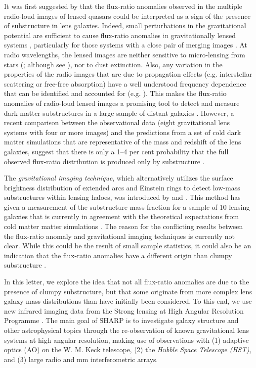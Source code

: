 \documentclass[a4paper,fleqn,usenatbib,useAMS]{mnras}
\begin{document}
It was first suggested by \citet{Mao1998} that the flux-ratio anomalies observed in the multiple radio-loud images of lensed quasars could be interpreted as a sign of the presence of substructure in lens galaxies. Indeed, small perturbations in the gravitational potential are sufficient to cause flux-ratio anomalies in gravitationally lensed systems \citep{metcalf01,Dalal2002,Bradac02}, particularly for those systems with a close pair of merging images \citep{KD04}. At radio wavelengths, the lensed images are neither sensitive to micro-lensing from stars (\citealt{K03}; although see \citealt{koopmans00}), nor to dust extinction. Also, any variation in the properties of the radio images that are due to propagation effects (e.g. interstellar scattering or free-free absorption) have a well understood frequency dependence that can be identified and accounted for (e.g. \citealt{biggs03,M07,winn04}). This makes the flux-ratio anomalies of radio-loud lensed images a promising tool to detect and measure dark matter substructures in a large sample of distant galaxies \citep{Dalal2002}. However, a recent comparison between the observational data (eight gravitational lens systems with four or more images) and the predictions from a set of cold dark matter simulations that are representative of the mass and redshift of the lens galaxies, suggest that there is only a 1--4 per cent probability that the full observed flux-ratio distribution is produced only by substructure \citep{Xu15}.

The \emph{gravitational imaging technique}, which alternatively utilizes the surface brightness distribution of extended arcs and Einstein rings to detect low-mass substructures within lensing haloes, was introduced by \citet{K05} and \citet{V09}. This method has given a measurement of the substructure mass fraction for a sample of 10 lensing galaxies that is currently in agreement with the theoretical expectations from cold matter matter simulations \citep{V14a,V12}. The reason for the conflicting results between the flux-ratio anomaly and gravitational imaging techniques is currently not clear.  While this could be the result of small sample statistics, it could also be an indication that the flux-ratio anomalies have a different origin than clumpy substructure \citep[see][for a discussion]{Xu15}.

 
In this letter, we explore the idea that not all flux-ratio anomalies are due to the presence of clumpy substructure, but that some originate from more complex lens galaxy mass distributions than have initially been considered. To this end, we use new infrared imaging data from the Strong lensing at High Angular Resolution Programme \citep[SHARP;][]{mckean07,lagattuta10,SHARP12, V12}. The main goal of SHARP is to investigate galaxy structure and other astrophysical topics through the re-observation of known gravitational lens systems at high angular resolution, making use of observations with (1) adaptive optics (AO) on the W. M. Keck telescope, (2) the {\it Hubble Space Telescope (HST)}, and (3) large radio and mm interferometric arrays. 
\end{document}
